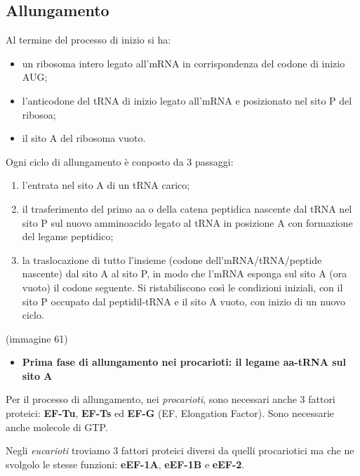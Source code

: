 \documentclass[11pt]{book}
\begin{document}
\subsection{Allungamento}\label{allungamento}

Al termine del processo di inizio si ha:

\begin{itemize}
\itemsep1pt\parskip0pt
\item
  un ribosoma intero legato all'mRNA in corrispondenza del codone di
  inizio AUG;
\item
  l'anticodone del tRNA di inizio legato all'mRNA e posizionato nel sito
  P del ribosoa;
\item
  il sito A del ribosoma vuoto.
\end{itemize}

Ogni ciclo di allungamento è conposto da 3 passaggi:

\begin{enumerate}
\def\labelenumi{\arabic{enumi}.}
\itemsep1pt\parskip0pt
\item
  l'entrata nel sito A di un tRNA carico;
\item
  il trasferimento del primo aa o della catena peptidica nascente dal
  tRNA nel sito P sul nuovo amminoacido legato al tRNA in posizione A
  con formazione del legame peptidico;
\item
  la traslocazione di tutto l'insieme (codone dell'mRNA/tRNA/peptide
  nascente) dal sito A al sito P, in modo che l'mRNA esponga sul sito A
  (ora vuoto) il codone seguente. Si ristabiliscono così le condizioni
  iniziali, con il sito P occupato dal peptidil-tRNA e il sito A vuoto,
  con inizio di un nuovo ciclo.
\end{enumerate}

(immagine 61)

\begin{itemize}
\itemsep1pt\parskip0pt
\item
  \textbf{Prima fase di allungamento nei procarioti: il legame aa-tRNA
  sul sito A}
\end{itemize}

Per il processo di allungamento, nei \emph{procarioti}, sono necessari
anche 3 fattori proteici: \textbf{EF-Tu}, \textbf{EF-Ts} ed
\textbf{EF-G} (EF, Elongation Factor). Sono necessarie anche molecole di
GTP.

Negli \emph{eucarioti} troviamo 3 fattori proteici diversi da quelli
procariotici ma che ne svolgolo le stesse funzioni: \textbf{eEF-1A},
\textbf{eEF-1B} e \textbf{eEF-2}.
\end{document}
